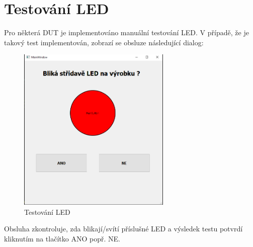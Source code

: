 \clearpage
\section{Testování LED}
Pro některá DUT je implementováno manuální testování LED. V případě, že je takový test implementován, zobrazí
se obsluze následující dialog:
\begin{figure}[ht!]
	\centering
	\includegraphics[width = 0.65\textwidth]{obrazky/LED_test.PNG}
    \caption{Testování LED}
\end{figure}

Obsluha zkontroluje, zda blikají/svítí příslušné LED a výsledek testu potvrdí kliknutím na tlačítko ANO popř. NE.
\clearpage
